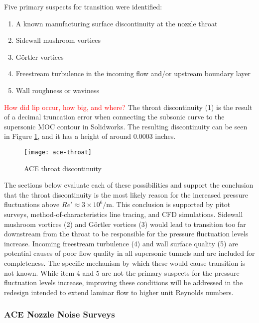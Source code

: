 Five primary suspects for transition were identified:

\begin{enumerate}
    \item A known manufacturing surface discontinuity at the nozzle throat
    \item Sidewall mushroom vortices
    \item Görtler vortices
    \item Freestream turbulence in the incoming flow and/or upstream boundary layer
    \item Wall roughness or waviness
\end{enumerate}

\textcolor{red}{How did lip occur, how big, and where?} The throat discontinuity (1) is the result of a decimal truncation error when connecting the subsonic curve to the supersonic MOC contour in Solidworks. The resulting discontinuity can be seen in Figure \ref{fig:ace-throat}, and it has a height of around 0.0003 inches. 

\begin{figure}[ht]
    \centering
    \texttt{[image: ace-throat]}
    \caption{ACE throat discontinuity}
    \label{fig:ace-throat}
\end{figure}


The sections below evaluate each of these possibilities and support the conclusion that the throat discontinuity is the most likely reason for the increased pressure fluctuations above $Re' \approx 3 \times 10^6/\mathrm{m}$. This conclusion is supported by pitot surveys, method-of-characteristics line tracing, and CFD simulations. Sidewall mushroom vortices (2) and Görtler vortices (3) would lead to transition too far downstream from the throat to be responsible for the pressure fluctuation levels increase. Incoming freestream turbulence (4) and wall surface quality (5) are potential causes of poor flow quality in all supersonic tunnels and are included for completeness. The specific mechanism by which these would cause transition is not known. While item 4 and 5 are not the primary suspects for the pressure fluctuation levels increase, improving these conditions will be addressed in the redesign intended to extend laminar flow to higher unit Reynolds numbers.

\subsubsection*{ACE Nozzle Noise Surveys}

